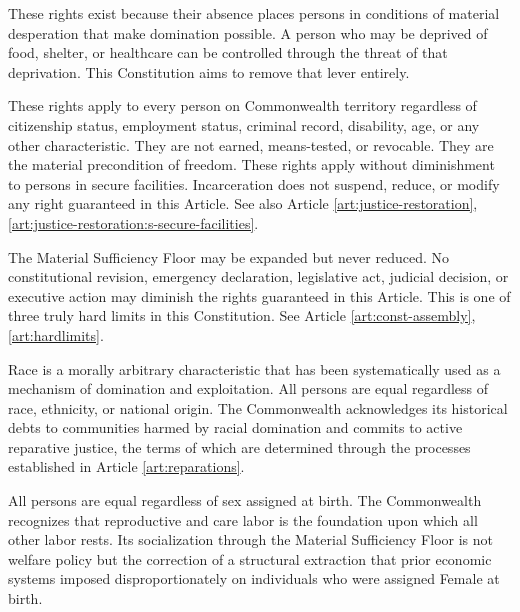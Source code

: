 These rights exist because their absence places persons in conditions of material desperation that make domination possible. A person who may be deprived of food, shelter, or healthcare can be controlled through the threat of that deprivation. This Constitution aims to remove that lever entirely.

These rights apply to every person on Commonwealth territory regardless of citizenship status, employment status, criminal record, disability, age, or any other characteristic. They are not earned, means-tested, or revocable. They are the material precondition of freedom. These rights apply without diminishment to persons in secure facilities. Incarceration does not suspend, reduce, or modify any right guaranteed in this Article. See also Article \ref{art:justice-restoration}, \ref{art:justice-restoration:s-secure-facilities}.

The Material Sufficiency Floor may be expanded but never reduced. No constitutional revision, emergency declaration, legislative act, judicial decision, or executive action may diminish the rights guaranteed in this Article. This is one of three truly hard limits in this Constitution. See Article \ref{art:const-assembly}, \ref{art:hardlimits}.


Race is a morally arbitrary characteristic that has been systematically used as a mechanism of domination and exploitation. All persons are equal regardless of race, ethnicity, or national origin. The Commonwealth acknowledges its historical debts to communities harmed by racial domination and commits to active reparative justice, the terms of which are determined through the processes established in Article \ref{art:reparations}.

All persons are equal regardless of sex assigned at birth. The Commonwealth recognizes that reproductive and care labor is the foundation upon which all other labor rests. Its socialization through the Material Sufficiency Floor is not welfare policy but the correction of a structural extraction that prior economic systems imposed disproportionately on individuals who were assigned Female at birth.

